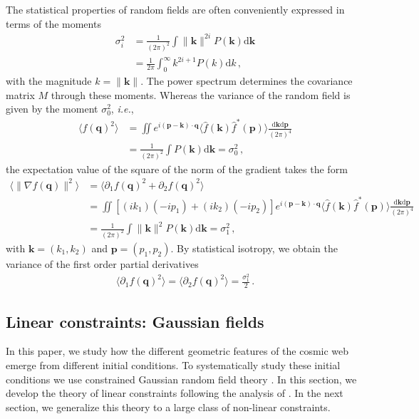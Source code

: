 \documentclass[a4paper, 11pt]{article}
\begin{document}
The statistical properties of random fields are often conveniently expressed in terms of the moments
\begin{align}
\sigma_i^2 &= \frac{1}{(2\pi)^2} \int \|\bm{k}\|^{2i}P(\bm{k})\mathrm{d}\bm{k}\nonumber\\
&= \frac{1}{2\pi} \int_0^\infty k^{2i+1}P(k)\mathrm{d}k\,,
\end{align}
with the magnitude $k = \|\bm{k}\|$. The power spectrum determines the covariance matrix $M$ through these moments. Whereas the variance of the random field is given by the moment $\sigma_0^2$, \textit{i.e.},
\begin{align}
\langle f(\bm{q})^2 \rangle &= \iint e^{i (\bm{p} - \bm{k})\cdot \bm{q}} \langle \hat{f}(\bm{k})\hat{f}^*(\bm{p})\rangle \frac{\mathrm{d}\bm{k}\mathrm{d}\bm{p}}{(2\pi)^4}\nonumber\\
&=\frac{1}{(2\pi)^2}\int P(\bm{k})\mathrm{d}\bm{k}=\sigma_0^2\,,
\end{align}
the expectation value of the square of the norm of the gradient takes the form
\begin{align}
\langle \|\nabla f(\bm{q})\|^2\rangle &= \langle \partial_1f(\bm{q})^2 + \partial_2 f(\bm{q})^2 \rangle \nonumber \\
&= \iint [(ik_1)(-ip_1)+(ik_2)(-ip_2)] e^{i (\bm{p} - \bm{k})\cdot \bm{q}} \langle \hat{f}(\bm{k})\hat{f}^*(\bm{p})\rangle \frac{\mathrm{d}\bm{k}\mathrm{d}\bm{p}}{(2\pi)^4}\nonumber \\
&=\frac{1}{(2\pi)^2}\int \|\bm{k}\|^2 P(\bm{k})\mathrm{d}\bm{k}=\sigma_1^2\,,
\end{align}
with $\bm{k}=(k_1,k_2)$ and $\bm{p}=(p_1,p_2)$. By statistical isotropy, we obtain the variance of the first order partial derivatives
\begin{align}
\langle \partial_1 f(\bm{q})^2\rangle =\langle \partial_2 f(\bm{q})^2\rangle =\frac{\sigma_1^2}{2}\,.
\end{align}


\subsection{Linear constraints: Gaussian fields}
In this paper, we study how the different geometric features of the cosmic web emerge from different initial conditions. To systematically study these initial conditions we use constrained Gaussian random field theory \cite{Bertschinger:1987, Hoffman:1991, Sheth:1995, Weygaert:1996}. In this section, we develop the theory of linear constraints following the analysis of \cite{Weygaert:1996}. In the next section, we generalize this theory to a large class of non-linear constraints. %
\end{document}
